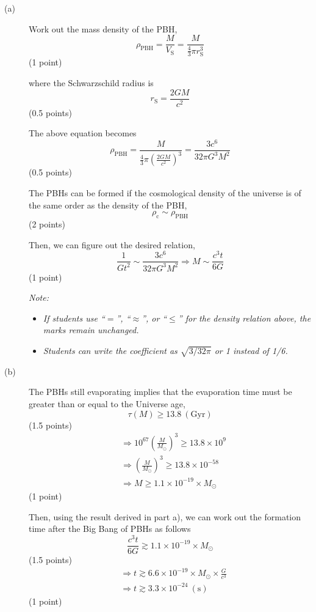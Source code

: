 \begin{description}
\item[(a)] Work out the mass density of the PBH,
  \[ \rho_{\mathrm{PBH}} = \frac{M}{V_{\mathrm{S}}}
     = \frac{M}{\frac{4}{3}\pi r_{\mathrm{S}}^3} \]
  \hfill(1 point)

  where the Schwarzschild radius is
  \[ r_{\mathrm{S}} = \frac{2GM}{c^2} \]
  \hfill(0.5 points)

  The above equation becomes
  \[ \rho_{\mathrm{PBH}}
     = \frac{M}{\frac{4}{3}\pi\left(\frac{2GM}{c^2}\right)^3}
     = \frac{3c^6}{32\pi G^3 M^2} \]
  \hfill(0.5 points)

  The PBHs can be formed if the cosmological density of the universe is of
  the same order as the density of the PBH,
  \[ \rho_{\mathrm{c}} \sim \rho_{\mathrm{PBH}} \]
  \hfill(2 points)

  Then, we can figure out the desired relation,
  \[ \frac{1}{Gt^2} \sim \frac{3c^6}{32\pi G^3 M^2}
     \Rightarrow M \sim \frac{c^3 t}{6G} \]
  \hfill(1 point)

  \textit{Note:}
  \begin{itemize}
  \item \textit{If students use ``$=$'', ``$\approx$'', or ``$\le$'' for the
    density relation above, the marks remain unchanged.}
  \item \textit{Students can write the coefficient as $\sqrt{3/32\pi}$ or 1
    instead of 1/6.}
  \end{itemize}

\item[(b)] The PBHs still evaporating implies that the evaporation time must
  be greater than or equal to the Universe age,
  \[ \tau(M) \ge 13.8\ \mathrm{(Gyr)} \]
  \hfill(1.5 points)
  \begin{align*}
    &\Rightarrow 10^{67}\left(\frac{M}{M_\odot}\right)^3 \ge 13.8 \times 10^9 \\
    &\Rightarrow \left(\frac{M}{M_\odot}\right)^3 \ge 13.8 \times 10^{-58} \\
    &\Rightarrow M \ge 1.1 \times 10^{-19} \times M_\odot
  \end{align*}
  \hfill(1 point)

  Then, using the result derived in part a), we can work out the formation
  time after the Big Bang of PBHs as follows
  \[ \frac{c^3 t}{6G} \gtrsim 1.1 \times 10^{-19} \times M_\odot \]
  \hfill(1.5 points)
  \begin{align*}
    &\Rightarrow t \gtrsim 6.6 \times 10^{-19} \times M_\odot \times \frac{G}{c^3} \\
    &\Rightarrow t \gtrsim 3.3 \times 10^{-24}\ \mathrm{(s)}
  \end{align*}
  \hfill(1 point)


\end{description}
